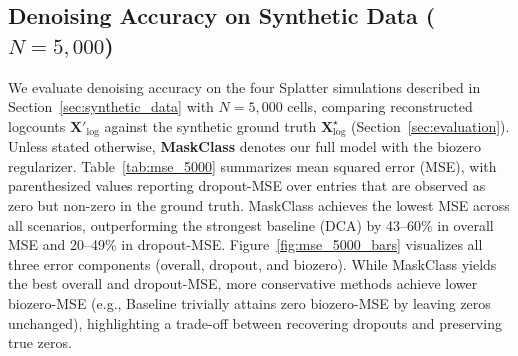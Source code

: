 \documentclass{article}
\theoremstyle{plain}
\theoremstyle{definition}
\theoremstyle{remark}
\begin{document}
\subsection{Denoising Accuracy on Synthetic Data ($N=5{,}000$)}
\label{sec:denoising_results}
We evaluate denoising accuracy on the four Splatter simulations described in
Section~\ref{sec:synthetic_data} with $N=5{,}000$ cells, comparing reconstructed logcounts
$\mathbf{X}'_{\log}$ against the synthetic ground truth
$\mathbf{X}^{\star}_{\log}$ (Section~\ref{sec:evaluation}). Unless stated
otherwise, \textbf{MaskClass} denotes our full model with the biozero
regularizer. Table~\ref{tab:mse_5000}
summarizes mean squared error (MSE), with parenthesized values reporting
dropout-MSE over entries that are observed as zero but non-zero in the ground
truth. MaskClass achieves the lowest MSE across all scenarios, outperforming
the strongest baseline (DCA) by 43--60\% in overall MSE and 20--49\% in
dropout-MSE. Figure~\ref{fig:mse_5000_bars} visualizes all three error
components (overall, dropout, and biozero). While MaskClass yields the best
overall and dropout-MSE, more conservative methods achieve lower biozero-MSE
(e.g., Baseline trivially attains zero biozero-MSE by leaving zeros unchanged),
highlighting a trade-off between recovering dropouts and preserving true zeros.
\end{document}
